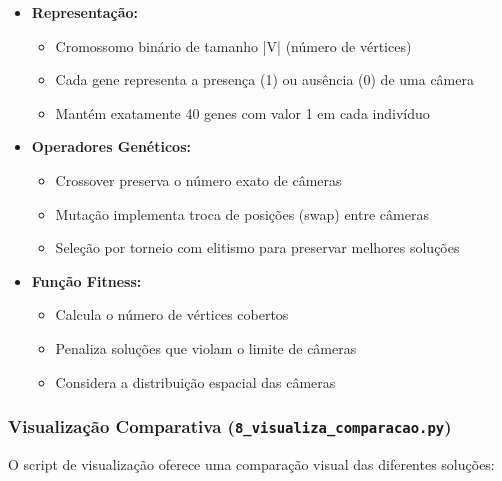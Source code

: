 \documentclass[12pt, a4paper]{report}
\begin{document}
\begin{itemize}
    \item \textbf{Representação:}
    \begin{itemize}
        \item Cromossomo binário de tamanho |V| (número de vértices)
        \item Cada gene representa a presença (1) ou ausência (0) de uma câmera
        \item Mantém exatamente 40 genes com valor 1 em cada indivíduo
    \end{itemize}
    
    \item \textbf{Operadores Genéticos:}
    \begin{itemize}
        \item Crossover preserva o número exato de câmeras
        \item Mutação implementa troca de posições (swap) entre câmeras
        \item Seleção por torneio com elitismo para preservar melhores soluções
    \end{itemize}
    
    \item \textbf{Função Fitness:}
    \begin{itemize}
        \item Calcula o número de vértices cobertos
        \item Penaliza soluções que violam o limite de câmeras
        \item Considera a distribuição espacial das câmeras
    \end{itemize}
\end{itemize}

\subsubsection{Visualização Comparativa (\texttt{8\_visualiza\_comparacao.py})}
O script de visualização oferece uma comparação visual das diferentes soluções:
\end{document}
